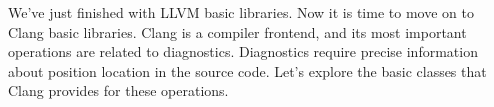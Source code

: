 We've just finished with LLVM basic libraries. Now it is time to move on to Clang basic libraries. Clang is a compiler frontend, and its most important operations are related to diagnostics. Diagnostics require precise information about position location in the source code. Let's explore the basic classes that Clang provides for these operations.


















































































